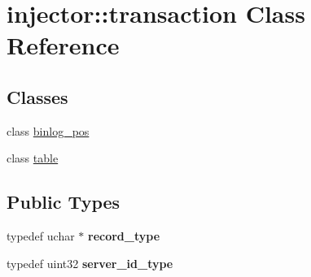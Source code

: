 \hypertarget{classinjector_1_1transaction}{}\section{injector\+:\+:transaction Class Reference}
\label{classinjector_1_1transaction}
\subsection*{Classes}
\begin{DoxyCompactItemize}
\item 
class \mbox{\hyperlink{classinjector_1_1transaction_1_1binlog__pos}{binlog\+\_\+pos}}
\item 
class \mbox{\hyperlink{classinjector_1_1transaction_1_1table}{table}}
\end{DoxyCompactItemize}
\subsection*{Public Types}
\begin{DoxyCompactItemize}
\item 
\mbox{\label{classinjector_1_1transaction_a1282448fc04b46473713bcecab54663a}} 
typedef uchar $\ast$ {\bfseries record\+\_\+type}
\item 
\mbox{\label{classinjector_1_1transaction_a9c6e24e277125d6b6e91206fbd2a917b}} 
typedef uint32 {\bfseries server\+\_\+id\+\_\+type}
\end{DoxyCompactItemize}
